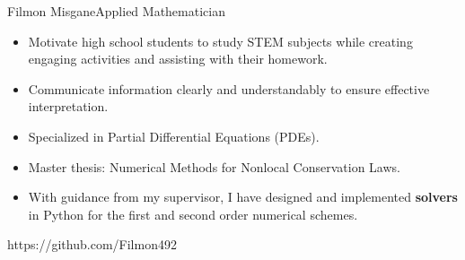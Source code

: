 \documentclass{article}
\begin{document}
\begin{cv}{Filmon Misgane}{Applied Mathematician}
    \begin{cvevent}[08.2022][Present]  
        \begin{itemize}
            \item Motivate high school students to study STEM subjects while creating engaging activities and assisting with their homework.
        \end{itemize}
        \hrulefill
    \end{cvevent}

    \begin{cvevent}[05.2022][Present]  
        \begin{itemize}
            \item Communicate information clearly and understandably to ensure effective interpretation.
        \end{itemize}
        \hrulefill
    \end{cvevent}

    \begin{cvevent}[08.2024][Present] 
        \begin{itemize}
            \item Specialized in Partial Differential Equations (PDEs).
            \item Master thesis: Numerical Methods for Nonlocal Conservation Laws.
            \item With guidance from my supervisor, I have designed and implemented \textbf{solvers} in Python for the first and second order numerical schemes.
        \end{itemize}
        \hrulefill
    \end{cvevent}

    \begin{cvevent}[08.2021][06.2024] 
        \hrulefill
    \end{cvevent}


    \cvsidebar %
    https://github.com/Filmon492


\end{cv}
\end{document}
